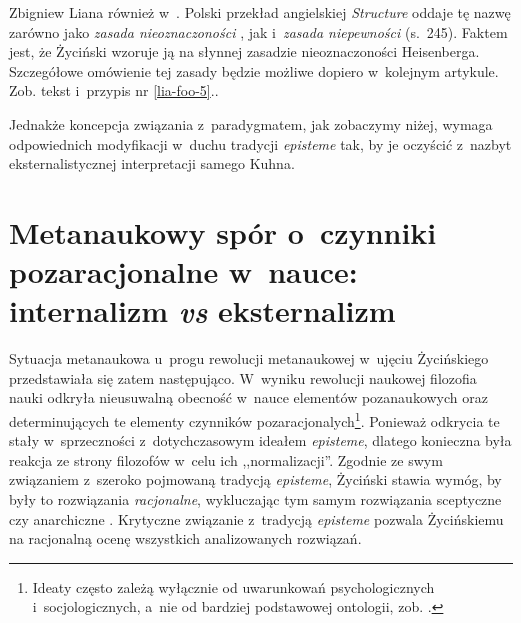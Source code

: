 \begin{artplenv}{Zbigniew Liana}
{również w~\parencite[s.~159]{zycinski_teizm_1985}.
Polski przekład angielskiej
\textit{Structure} oddaje tę nazwę zarówno jako \textit{zasada nieoznaczoności}
\parencite[s.~240]{zycinski_struktura_2013},
jak i~\textit{zasada niepewności}
(s.~245).
Faktem jest, że
Życiński wzoruje ją na słynnej zasadzie nieoznaczoności Hei\-senberga. Szczegółowe omówienie tej zasady będzie możliwe
dopiero w~kolejnym artykule. Zob. tekst i~przypis nr \ref{lia-foo-5}.}.

Jednakże koncepcja związania z~paradygmatem, jak zobaczymy niżej, wymaga odpowiednich modyfikacji w~duchu tradycji
\textit{episteme} tak, by je oczyścić z~nazbyt eksternalistycznej interpretacji samego Kuhna.

\section{Metanaukowy spór o~czynniki pozaracjonalne w~nauce: internalizm \textit{vs} eksternalizm}\label{lia-sec-5}

Sytuacja metanaukowa u~progu rewolucji metanaukowej w~ujęciu Życińskiego przedstawiała się zatem następująco. W~wyniku
rewolucji naukowej filozofia nauki odkryła nieusuwalną obecność w~nauce elementów pozanaukowych oraz determinujących te
elementy czynników pozaracjonalych\footnote{Ideaty często zależą wyłącznie od uwarunkowań
psychologicznych i~socjologicznych, a~nie od bardziej podstawowej ontologii, zob.
\parencites[s.~29]{zycinski_structure_1988}[s.~51]{zycinski_struktura_2013}.
}. Ponieważ odkrycia te stały w~sprzeczności z~dotychczasowym ideałem \textit{episteme}, dlatego konieczna była
reakcja ze strony filozofów w~celu ich ,,normalizacji''. Zgodnie ze swym związaniem z~szeroko pojmowaną tradycją
\textit{episteme}, Życiński stawia wymóg, by były to rozwiązania \textit{racjonalne}, wykluczając tym samym rozwiązania
sceptyczne czy anarchiczne
\parencites[s.~143]{zycinski_structure_1988}[s.~254]{zycinski_struktura_2013}.
Krytyczne
związanie z~tradycją \textit{episteme} pozwala Życińskiemu na racjonalną ocenę wszystkich analizowanych rozwiązań.


\end{artplenv}
